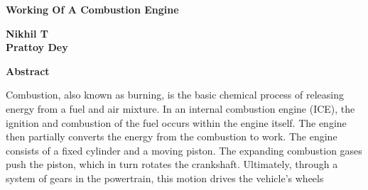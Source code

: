 \documentclass[10pt,a4paper]{article}
\begin{document}
 \begin{center}
     \Large
     \textbf{Working Of A Combustion Engine}
     
     \vspace{0.4cm}
     \large
     \textbf{Nikhil T \\ Prattoy Dey}
     
     \vspace{0.9cm}
     \textbf{Abstract}
 \end{center}    

 Combustion, also known as burning, is the basic chemical process of releasing
 energy from a fuel and air mixture. In an internal combustion engine (ICE), the
 ignition and combustion of the fuel occurs within the engine itself. The engine
 then partially converts the energy from the combustion to work. The engine
 consists of a fixed cylinder and a moving piston. The expanding combustion
 gases push the piston, which in turn rotates the crankshaft. Ultimately, through
 a system of gears in the powertrain, this motion drives the vehicle’s wheels
\end{document}
